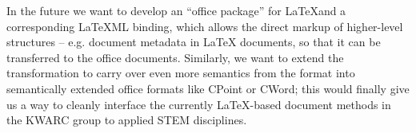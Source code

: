 \documentclass{llncs}
\def\latexml{{\LaTeX}ML\xspace}
\begin{document}
In the future we want to develop an ``office package'' for \LaTeX and a corresponding
\latexml binding, which allows the direct markup of higher-level structures --
e.g. document metadata in {\LaTeX} documents, so that it can be transferred to the office
documents. Similarly, we want to extend the transformation to carry over even more
semantics from the \stex format into semantically extended office formats like CPoint or
CWord; this would finally give us a way to cleanly interface the currently {\LaTeX}-based
document methods in the KWARC group to applied STEM disciplines.

\printbibliography
\end{document}
